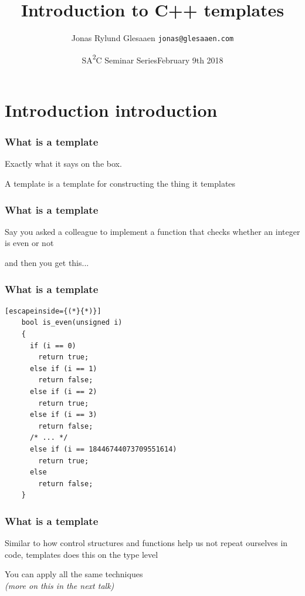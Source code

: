 \documentclass[14pt]{beamer}
\title{Introduction to C++ templates}
\author{\texorpdfstring{%
    Jonas Rylund Glesaaen\newline%
    \fontsize{12pt}{12pt}\selectfont\texttt{jonas@glesaaen.com}%
  }{%
    Jonas Rylund Glesaaen}}
\date{\texorpdfstring{%
    SA{\color{SAACOrange}\textsuperscript{2}}C Seminar Series\newline{}February 9th 2018%
  }{%
    February 9th 2018}}
\begin{document}
\nocite{*}

\frame{\titlepage}

\section{Introduction introduction}
\frame{\sectionpage}

\begin{frame}[fragile]
  \frametitle{What is a template}

  \begin{minipage}{0.8\textwidth}
    Exactly what it says on the box.

    \vspace{1cm}
    A template is a template for constructing the thing it templates
  \end{minipage}

\end{frame}

\begin{frame}[fragile]
  \frametitle{What is a template}

  \begin{minipage}{0.8\textwidth}
    Say you asked a colleague to implement a function that checks whether an
    integer is even or not
  
    \vspace{1.5cm}
  
    and then you get this...
  \end{minipage}

\end{frame}

\begin{frame}[fragile]
  \frametitle{What is a template}

  \begin{lstlisting}[escapeinside={(*}{*)}]
    bool is_even(unsigned i)
    {
      if (i == 0)
        return true;
      else if (i == 1)
        return false;
      else if (i == 2)
        return true;
      else if (i == 3)
        return false;
      /* ... */
      else if (i == 18446744073709551614)
        return true;
      else
        return false;
    }
  \end{lstlisting}

\end{frame}

\begin{frame}[fragile]
  \frametitle{What is a template}

  Similar to how control structures and functions help us not repeat ourselves
  in code, templates does this on the type level

  \vspace{.75cm}

  You can apply all the same techniques \\
  {\itshape\changefontsize{10pt}(more on this in the next talk)}

\end{frame}
\end{document}

